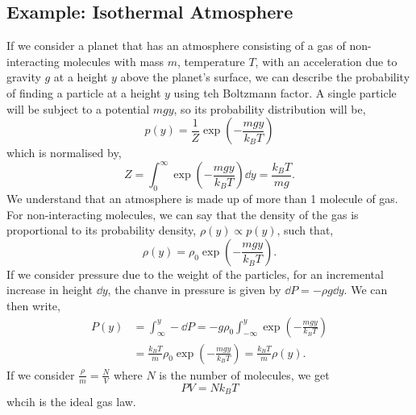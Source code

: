 \documentclass{book}
\begin{document}
\subsection{Example: Isothermal Atmosphere}
If we consider a planet that has an atmosphere consisting of a gas of non-interacting molecules with mass $m$, temperature $T$, with an acceleration due to gravity $g$ at a height $y$ above the planet's surface, we can describe the probability of finding a particle at a height $y$ using teh Boltzmann factor. A single particle will be subject to a potential $mgy$, so its probability distribution will be,
\begin{equation}
	p(y) = \frac{1}{Z} \exp \left(-\frac{mgy}{k_BT}\right)
\end{equation}
which is normalised by,
\begin{equation}
	Z = \int_0^\infty \exp\left(-\frac{mgy}{k_BT}\right) \dd{y} = \frac{k_BT}{mg}.
\end{equation}
We understand that an atmosphere is made up of more than 1 molecule of gas. For non-interacting molecules, we can say that the density of the gas is proportional to its probability density, $\rho(y) \propto p(y)$, such that,
\begin{equation}
	\rho(y) = \rho_0 \exp \left(-\frac{mgy}{k_BT}\right).
\end{equation}
If we consider pressure due to the weight of the particles, for an incremental increase in height $\dd{y}$, the chanve in pressure is given by $\dd{P} = - \rho g \dd{y}$. We can then write,
\begin{equation}
	\begin{split}
		P(y) & = \int_{\infty}^{y}-\dd{P} = -g\rho_0 \int_{-\infty}^{y}\exp\left(-\frac{mgy}{k_BT}\right) \\
		& = \frac{k_BT}{m}\rho_0 \exp\left(-\frac{mgy}{k_BT}\right)  = \frac{k_BT}{m}\rho(y).
	\end{split}
\end{equation}
If we consider $\frac{\rho}{m} = \frac{N}{V}$ where $N$ is the number of molecules, we get
\begin{equation}
	PV = Nk_BT
\end{equation}
whcih is the ideal gas law.
\appendix
\end{document}
